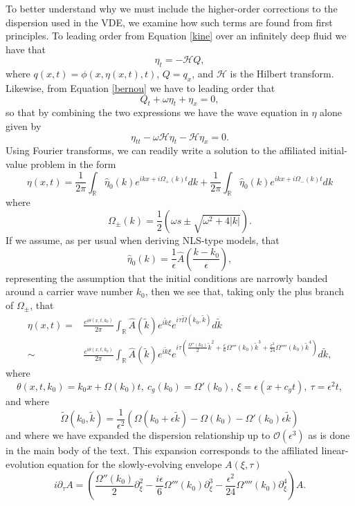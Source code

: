 \documentclass[a4paper,11pt]{article}
\newcommand{\pd}{\partial}
\begin{document}
To better understand why we must include the higher-order corrections to the dispersion used in the VDE, we examine how such terms are found from first principles.  To leading order from Equation \eqref{kine} over an infinitely deep fluid we have that 
\[
\eta_{t} = -\mathcal{H}Q,
\]
where $q(x,t) = \phi(x,\eta(x,t),t)$, $Q = q_{x}$, and $\mathcal{H}$ is the Hilbert transform.  Likewise, from Equation \eqref{bernou} we have to leading order that
\[
Q _{t}+ \omega\eta_{t} + \eta_{x}= 0, 
\]
so that by combining the two expressions we have the wave equation in $\eta$ alone given by 
\[
\eta_{tt}- \omega\mathcal{H}\eta_{t} - \mathcal{H}\eta_{x}= 0.
\]
Using Fourier transforms, we can readily write a solution to the affiliated initial-value problem in the form
\[
\eta(x,t) = \frac{1}{2\pi}\int_{\mathbb{R}}\hat{\eta}_{0}(k) e^{ikx+i\Omega_{+}(k)t} dk + \frac{1}{2\pi}\int_{\mathbb{R}}\hat{\eta}_{0}(k) e^{ikx+i\Omega_{-}(k)t} dk
\]
where
\[
\Omega_{\pm}(k) = \frac{1}{2}\left(\omega s \pm \sqrt{\omega^{2}+4|k|} \right).
\]
If we assume, as per usual when deriving NLS-type models, that 
\[
\hat{\eta}_{0}(k) = \frac{1}{\epsilon}\hat{A}\left(\frac{k-k_{0}}{\epsilon} \right), 
\]
representing the assumption that the initial conditions are narrowly banded around a carrier wave number $k_{0}$, then we see that, taking only the plus branch of $\Omega_{\pm}$, that  
\begin{align*}
\eta(x,t) = & \frac{e^{i\theta(x,t,k_{0})}}{2\pi}\int_{\mathbb{R}}\hat{A}(\tilde{k})e^{i\tilde{k}\xi} e^{i\tau \tilde{\Omega}(k_{0},\tilde{k})}d\tilde{k}\\
\sim & \frac{e^{i\theta(x,t,k_{0})}}{2\pi}\int_{\mathbb{R}}\hat{A}(\tilde{k})e^{i\tilde{k}\xi}e^{i\tau\left(\frac{\Omega''(k_{0})}{2}\tilde{k}^{2} + \frac{\epsilon}{6}\Omega'''(k_{0})\tilde{k}^{3} + \frac{\epsilon^{2}}{24}\Omega''''(k_{0})\tilde{k}^{4}\right)}d\tilde{k},
\end{align*}
where
\[
\theta(x,t,k_{0}) = k_{0}x + \Omega(k_{0})t, ~c_{g}(k_{0}) = \Omega'(k_{0}), ~ \xi = \epsilon(x+c_{g}t), ~ \tau = \epsilon^{2}t, 
\]
and where
\[
\tilde{\Omega}(k_{0},\tilde{k}) = \frac{1}{\epsilon^{2}}\left(\Omega(k_{0}+\epsilon \tilde{k})-\Omega(k_{0})-\Omega'(k_{0})\epsilon\tilde{k}\right) 
\]
and where we have expanded the dispersion relationship up to $\mathcal{O}(\epsilon^{3})$ as is done in the main body of the text.  This expansion corresponds to the affiliated linear-evolution equation for the slowly-evolving envelope $A(\xi,\tau)$
\[
i\pd_{\tau}A = \left(\frac{\Omega''(k_{0})}{2}\pd_{\xi}^{2}-\frac{i\epsilon}{6}\Omega'''(k_{0})\pd_{\xi}^{3} - \frac{\epsilon^{2}}{24}\Omega''''(k_{0})\pd_{\xi}^{4}\right)A. 
\]
\end{document}
